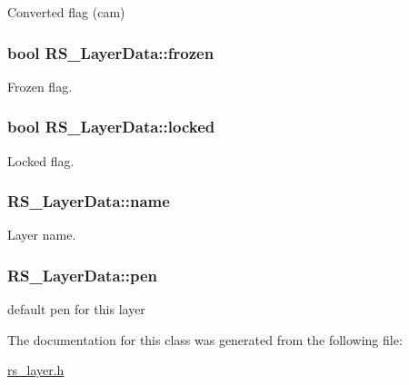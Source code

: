 Converted flag (cam) 

\hypertarget{class_r_s___layer_data_ad8354948505fd761a0adc5139583e5f5}{
\subsubsection[{frozen}]{\setlength{\rightskip}{0pt plus 5cm}bool R\-S\-\_\-\-Layer\-Data\-::frozen}}\label{class_r_s___layer_data_ad8354948505fd761a0adc5139583e5f5}


Frozen flag. 

\hypertarget{class_r_s___layer_data_a494d27995246b1865aabda3ce5e90974}{
\subsubsection[{locked}]{\setlength{\rightskip}{0pt plus 5cm}bool R\-S\-\_\-\-Layer\-Data\-::locked}}\label{class_r_s___layer_data_a494d27995246b1865aabda3ce5e90974}


Locked flag. 

\hypertarget{class_r_s___layer_data_a1498ff898dacc250220f3335a1846f94}{
\subsubsection[{name}]{ R\-S\-\_\-\-Layer\-Data\-::name}}\label{class_r_s___layer_data_a1498ff898dacc250220f3335a1846f94}


Layer name. 

\hypertarget{class_r_s___layer_data_af48b45bd16d5049c5cf119937e3431dc}{
\subsubsection[{pen}]{ R\-S\-\_\-\-Layer\-Data\-::pen}}\label{class_r_s___layer_data_af48b45bd16d5049c5cf119937e3431dc}


default pen for this layer 



The documentation for this class was generated from the following file\-:\begin{DoxyCompactItemize}
\item 
\hyperlink{rs__layer_8h}{rs\-\_\-layer.\-h}\end{DoxyCompactItemize}
